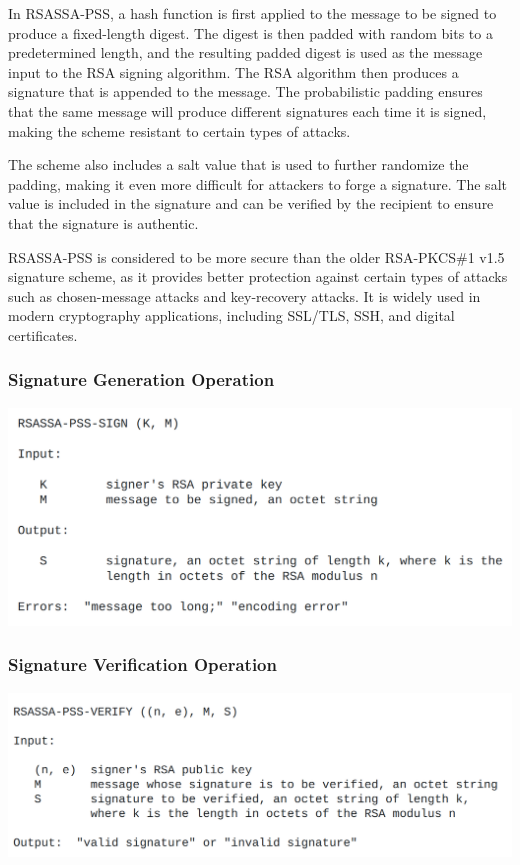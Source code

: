 \documentclass{article}
\begin{document}
In RSASSA-PSS, a hash function is first applied to the message to be signed to produce a fixed-length digest. The digest is then padded with random bits to a predetermined length, and the resulting padded digest is used as the message input to the RSA signing algorithm. The RSA algorithm then produces a signature that is appended to the message. The probabilistic padding ensures that the same message will produce different signatures each time it is signed, making the scheme resistant to certain types of attacks.

The scheme also includes a salt value that is used to further randomize the padding, making it even more difficult for attackers to forge a signature. The salt value is included in the signature and can be verified by the recipient to ensure that the signature is authentic.

RSASSA-PSS is considered to be more secure than the older RSA-PKCS\#1 v1.5 signature scheme, as it provides better protection against certain types of attacks such as chosen-message attacks and key-recovery attacks. It is widely used in modern cryptography applications, including SSL/TLS, SSH, and digital certificates.

\subsubsection{Signature Generation Operation}
\begin{center}
       \includegraphics[width=1.1\columnwidth]{media/RSASSA-SIGN.png}
\end{center}


\subsubsection{Signature Verification Operation}
\begin{center}
       \includegraphics[width=1.1\columnwidth]{media/RSASSA-VERIFY.png}
\end{center}
\end{document}
